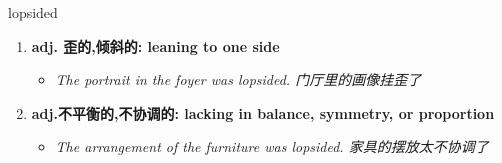 
\begin{frame}
{\huge lopsided}
\begin{center}
\begin{enumerate}\Large
  \item \textbf{adj. 歪的,倾斜的: leaning to one side}
  \begin{itemize}
    \item \em{\Large{The portrait in the foyer was lopsided. 门厅里的画像挂歪了}}
  \end{itemize}
  \item \textbf{adj.不平衡的,不协调的: lacking in balance, symmetry, or proportion}
  \begin{itemize}
    \item \em{\Large{The arrangement of the furniture was lopsided. 家具的摆放太不协调了}}
  \end{itemize}
\end{enumerate}
\end{center}
\end{frame}
